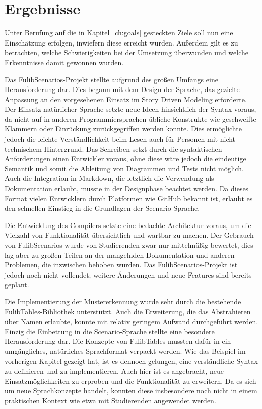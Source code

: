 \chapter{Ergebnisse}\label{ch:ergebnisse}

Unter Berufung auf die in Kapitel~\ref{ch:goals} gesteckten Ziele soll nun eine Einschätzung erfolgen, inwiefern diese erreicht wurden.
Außerdem gilt es zu betrachten, welche Schwierigkeiten bei der Umsetzung überwunden und welche Erkenntnisse damit gewonnen wurden.

Das FulibScenarios-Projekt stellte aufgrund des großen Umfangs eine Herausforderung dar.
Dies begann mit dem Design der Sprache, das gezielte Anpassung an den vorgesehenen Einsatz im Story Driven Modeling erforderte.
Der Einsatz natürlicher Sprache setzte neue Ideen hinsichtlich der Syntax voraus, da nicht auf in anderen Programmiersprachen übliche Konstrukte wie geschweifte Klammern oder Einrückung zurückgegriffen werden konnte.
Dies ermöglichte jedoch die leichte Verständlichkeit beim Lesen auch für Personen mit nicht-technischem Hintergrund.
Das Schreiben setzt durch die syntaktischen Anforderungen einen Entwickler voraus, ohne diese wäre jedoch die eindeutige Semantik und somit die Ableitung von Diagrammen und Tests nicht möglich.
Auch die Integration in Markdown, die letztlich die Verwendung als Dokumentation erlaubt, musste in der Designphase beachtet werden.
Da dieses Format vielen Entwicklern durch Platformen wie GitHub bekannt ist, erlaubt es den schnellen Einstieg in die Grundlagen der Scenario-Sprache.

Die Entwicklung des Compilers setzte eine bedachte Architektur voraus, um die Vielzahl von Funktionalität übersichtlich und wartbar zu machen.
Der Gebrauch von FulibScenarios wurde von Studierenden zwar nur mittelmäßig bewertet,
dies lag aber zu großen Teilen an der mangelnden Dokumentation und anderen Problemen, die inzwischen behoben wurden.
Das FulibScenarios-Projekt ist jedoch noch nicht vollendet;
weitere Änderungen und neue Features sind bereits geplant.

Die Implementierung der Mustererkennung wurde sehr durch die bestehende FulibTables-Bibliothek unterstützt.
Auch die Erweiterung, die das Abstrahieren über Namen erlaubte, konnte mit relativ geringem Aufwand durchgeführt werden.
Einzig die Einbettung in die Scenario-Sprache stellte eine besondere Herausforderung dar.
Die Konzepte von FulibTables mussten dafür in ein umgängliches, natürliches Sprachformat verpackt werden.
Wie das Beispiel im vorherigen Kapitel gezeigt hat, ist es dennoch gelungen, eine verständliche Syntax zu definieren und zu implementieren.
Auch hier ist es angebracht, neue Einsatzmöglichkeiten zu erproben und die Funktionalität zu erweitern.
Da es sich um neue Sprachkonzepte handelt, konnten diese insbesondere noch nicht in einem praktischen Kontext wie etwa mit Studierenden angewendet werden.


